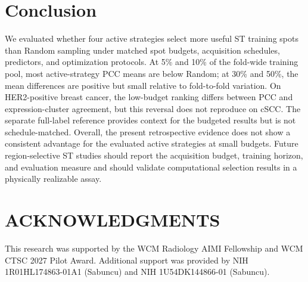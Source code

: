 \documentclass[]{spie}
\begin{document}
\section{Conclusion}

We evaluated whether four active strategies select more useful ST training spots than Random sampling under matched spot budgets, acquisition schedules, predictors, and optimization protocols. At 5\% and 10\% of the fold-wide training pool, most active-strategy PCC means are below Random; at 30\% and 50\%, the mean differences are positive but small relative to fold-to-fold variation. On HER2-positive breast cancer, the low-budget ranking differs between PCC and expression-cluster agreement, but this reversal does not reproduce on cSCC. The separate full-label reference provides context for the budgeted results but is not schedule-matched. Overall, the present retrospective evidence does not show a consistent advantage for the evaluated active strategies at small budgets. Future region-selective ST studies should report the acquisition budget, training horizon, and evaluation measure and should validate computational selection results in a physically realizable assay.

\section{ACKNOWLEDGMENTS}
This research was supported by the WCM Radiology AIMI Fellowship and WCM CTSC 2027 Pilot Award. Additional support was provided by NIH 1R01HL174863-01A1 (Sabuncu) and NIH 1U54DK144866-01 (Sabuncu).



\end{document}

